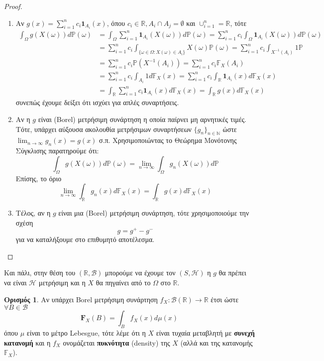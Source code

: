 \documentclass[12pt,a4paper]{article}
\theoremstyle{definition}
\numberwithin{equation}{section}
\newtheorem{orismos}{Ορισμός}
\begin{document}
{\begin{proof}
\begin{enumerate}
\item Αν $g(x) = \sum_{i=1}^n c_i\mathbf{1}_{A_i}(x)$, όπου $c_i \in \mathbb{R}, A_i \cap A_j = \emptyset$ και $\cup_{i=1}^n = \mathbb{R}$, τότε
\begin{align*}
 \int_\Omega g(X(\omega)) d\mathbb{P}(\omega) &= \int_\Omega \sum_{i=1}^n \mathbf{1}_{A_i}(X(\omega))d\mathbb{P}(\omega) = \sum_{i=1}^nc_i\int_\Omega \mathbf{1}_{A_i}(X(\omega))d\mathbb{P}(\omega)\\
 &= \sum_{i=1}^nc_i\int_{\{ \omega\in\Omega : X(\omega) \in A_i\}} X(\omega) \mathbb{P}(\omega) = \sum_{i=1}^n c_i \int_{X^{-1}(A_i)} 1 \mathbb{P}\\
&= \sum_{i=1}^n c_i \mathbb{P}(X^{-1}(A_i)) = \sum_{i=1}^n c_i \mathbb{F}_X(A_i)\\
&= \sum_{i=1}^n c_i \int_{A_i} 1 d\mathbb{F}_X(x)= \sum_{i=1}^n c_i \int_{\mathbb{R}} \mathbf{1}_{A_i} (x)d\mathbb{F}_X(x)\\
&= \int_{\mathbb{R}} \sum_{i=1}^n c_i \mathbf{1}_{A_i} (x)d\mathbb{F}_X(x)= \int_{\mathbb{R}} g(x) d\mathbb{F}_X(x)
\end{align*}
συνεπώς έχουμε δείξει ότι ισχύει για απλές συναρτήσεις.
\item  Αν η $g$ είναι (Borel) μετρήσιμη συνάρτηση η οποία παίρνει μη αρνητικές τιμές. Τότε, υπάρχει αύξουσα ακολουθία μετρήσιμων συναρτήσεων $\{g_n\}_{n\in\mathbb{N}}$ ώστε $\lim_{n\rightarrow \infty} g_n(x) = g(x)$ σ.π.
Χρησιμοποιώντας το Θεώρημα Μονότονης Σύγκλισης παρατηρούμε ότι:
$$\int_\Omega g(X(\omega))d\mathbb{P}(\omega) = \lim_{n\rightarrow \infty} \int_\Omega g_n(X(\omega)) d\mathbb{P}$$
Επίσης, το όριο
$$ \lim_{n\rightarrow \infty} \int_\mathbb{R} g_n(x) d\mathbb{F}_X(x) = \int_\mathbb{R} g(x)d\mathbb{F}_X(x)$$
\item Τέλος, αν η $g$ είναι μια (Borel) μετρήσιμη συνάρτηση, τότε χρησιμοποιούμε την σχέση
$$g = g^+ - g^-$$
για να καταλήξουμε στο επιθυμητό αποτέλεσμα.
\end{enumerate}
\end{proof}

Και πάλι, στην θέση του \((\mathbb{R},\mathcal{B})\) μπορούμε να έχουμε τον \((S,\mathcal{H})\) η \(g\) θα πρέπει να είναι \(\mathcal{H}\) μετρήσιμη και η \(X\) θα πηγαίνει από το \(\Omega\) στο \(\mathbb{R}\).\\

\begin{orismos} Αν υπάρχει Borel μετρήσιμη συνάρτηση $f_X:\mathcal{B}(\mathbb{R}) \rightarrow \mathbb{R}$ έτσι ώστε $\forall B \in \mathcal{B}$
$$\mathbf{F}_X(B) = \int_B f_X(x) d\mu(x)$$
όπου $\mu$ είναι το μέτρο Lebesgue, τότε λέμε ότι η $X$ είναι τυχαία μεταβλητή με \textbf{συνεχή κατανομή} και η $f_X$ ονομάζεται \textbf{πυκνότητα} (density) της $X$ (αλλά και της κατανομής $\mathbb{F}_X$).
\end{orismos}

}
\end{document}
